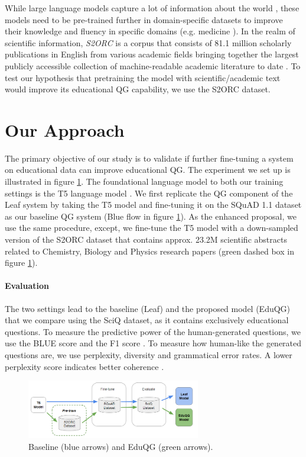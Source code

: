 \documentclass[letterpaper]{article} %
\begin{document}
While large language models capture a lot of information about the world \cite{raffel2020exploring}, these models need to be pre-trained further in domain-specific datasets to improve their knowledge and fluency in specific domains (e.g. medicine \cite{https://doi.org/10.48550/arxiv.2109.04588}). In the realm of scientific information, \emph{S2ORC} is a corpus that consists of 81.1 million scholarly publications in English from various academic fields bringing together the largest publicly accessible collection of machine-readable academic literature to date \cite{lo-etal-2020-s2orc}. To test our hypothesis that pretraining the model with scientific/academic text would improve its educational QG capability, we use the S2ORC dataset.

\section{Our Approach}

The primary objective of our study is to validate if further fine-tuning a system on educational data can improve educational QG. The experiment we set up is illustrated in figure \ref{fig:method}. The foundational language model to both our training settings is the T5 language model \cite{raffel2020exploring}. We first replicate the QG component of the Leaf system \cite{vachev2022leaf} by taking the T5 model and fine-tuning it on the SQuAD 1.1 dataset as our baseline QG system (Blue flow in figure \ref{fig:method}). As the enhanced proposal, we use the same procedure, except, we fine-tune the T5 model with a down-sampled version of the S2ORC dataset  that contains approx. {23.2M} scientific abstracts related to Chemistry, Biology and Physics research papers (green dashed box in figure \ref{fig:method}).

\paragraph{Evaluation}
The two settings lead to the baseline (Leaf) and the proposed model (EduQG) that we compare using the SciQ dataset, as it contains exclusively educational questions.
To measure the predictive power of the human-generated questions, we use the BLUE score and the F1 score \cite{DBLP:rajpurkar2016squad}. To measure how human-like the generated questions are, we use perplexity, diversity and grammatical error rates. A lower perplexity score indicates better coherence \cite{wang2022towards}.
\vspace{-1.50mm}
\begin{figure}[]
\centering
\includegraphics[width=0.9\columnwidth,height=1.01in ]{methodology_new_v2.png}
\caption{Baseline (blue arrows) and EduQG (green arrows).}
\label{fig:method}
\end{figure}
\end{document}
